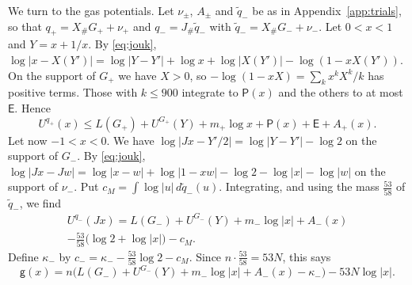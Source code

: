 We turn to the gas potentials. Let $\nu_\pm$, $A_\pm$ and $\tilde q_-$ be as in Appendix~\ref{app:trials}, so that $q_+=X_\#G_++\nu_+$ and $q_-=J_\#\tilde q_-$ with $\tilde q_-=X_\#G_-+\nu_-$.
Let $0<x<1$ and $Y=x+1/x$. By \eqref{eq:jouk}, $\log|x-X(Y')|=\log|Y-Y'|+\log x+\log|X(Y')|-\log(1-xX(Y'))$. On the support of $G_+$ we have $X>0$, so
$-\log(1-xX)=\sum_kx^kX^k/k$ has positive terms. Those with $k\le900$ integrate to $\mathsf P(x)$ and the others to at most $\mathsf E$. Hence
\begin{equation}\label{eq:qplus}
 U^{q_+}(x)\le L(G_+)+U^{G_+}(Y)+m_+\log x+\mathsf P(x)+\mathsf E+A_+(x).
\end{equation}
Let now $-1<x<0$. We have $\log|Jx-Y'/2|=\log|Y-Y'|-\log2$ on the support of $G_-$. By \eqref{eq:jouk},
$\log|Jx-Jw|=\log|x-w|+\log|1-xw|-\log2-\log|x|-\log|w|$ on the support of $\nu_-$. Put $c_M=\int\log|u|\,d\tilde q_-(u)$. Integrating, and using the mass $\frac{53}{58}$ of $\tilde q_-$, we find
\begin{multline}\label{eq:qminus}
 U^{q_-}(Jx)=L(G_-)+U^{G_-}(Y)+m_-\log|x|+A_-(x)\\
 -\tfrac{53}{58}\bigl(\log2+\log|x|\bigr)-c_M.
\end{multline}
Define $\kappa_-$ by $c_-=\kappa_--\frac{53}{58}\log2-c_M$. Since $n\cdot\frac{53}{58}=53N$, this says
\begin{equation}\label{eq:gneg}
 \mathsf g(x)=n\bigl(L(G_-)+U^{G_-}(Y)+m_-\log|x|+A_-(x)-\kappa_-\bigr)-53N\log|x|.
\end{equation}

